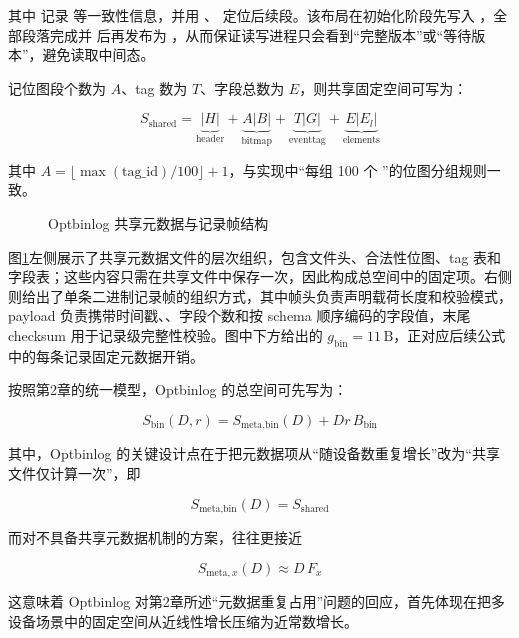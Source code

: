 其中  记录  等一致性信息，并用 、 定位后续段。该布局在初始化阶段先写入 ，全部段落完成并  后再发布为 ，从而保证读写进程只会看到``完整版本''或``等待版本''，避免读取中间态。

记位图段个数为 \(A\)、tag 数为 \(T\)、字段总数为 \(E\)，则共享固定空间可写为：

\begin{equation}
S_{\text{shared}}=\underbrace{|H|}_{\text{header}}+\underbrace{A|B|}_{\text{bitmap}}+\underbrace{T|G|}_{\text{eventtag}}+\underbrace{E|E_l|}_{\text{elements}}
\label{eq:ch3-s-shared}
\end{equation}

其中 \(A=\lfloor \max(\mathrm{tag\_id})/100\rfloor+1\)，与实现中``每组 100 个 ''的位图分组规则一致。

\begin{figure}[H]
\centering

\caption{Optbinlog 共享元数据与记录帧结构}
\label{fig:optbinlog-data-structure}
\end{figure}

图\ref{fig:optbinlog-data-structure}左侧展示了共享元数据文件的层次组织，包含文件头、合法性位图、tag 表和字段表；这些内容只需在共享文件中保存一次，因此构成总空间中的固定项。右侧则给出了单条二进制记录帧的组织方式，其中帧头负责声明载荷长度和校验模式，payload 负责携带时间戳、、字段个数和按 schema 顺序编码的字段值，末尾 checksum 用于记录级完整性校验。图中下方给出的 \(g_{\text{bin}}=11\,\mathrm{B}\)，正对应后续公式中的每条记录固定元数据开销。

按照第2章的统一模型，Optbinlog 的总空间可先写为：

\[
S_{\text{bin}}(D,r)=S_{\text{meta},\text{bin}}(D)+Dr\,B_{\text{bin}}
\]

其中，Optbinlog 的关键设计点在于把元数据项从``随设备数重复增长''改为``共享文件仅计算一次''，即

\[
S_{\text{meta},\text{bin}}(D)=S_{\text{shared}}
\]

而对不具备共享元数据机制的方案，往往更接近

\[
S_{\text{meta},x}(D)\approx D\,F_x
\]

这意味着 Optbinlog 对第2章所述``元数据重复占用''问题的回应，首先体现在把多设备场景中的固定空间从近线性增长压缩为近常数增长。


